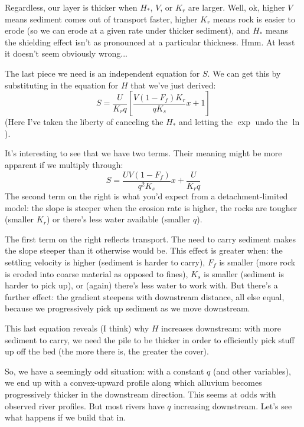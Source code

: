 \documentclass[12pt]{amsart}
\begin{document}
Regardless, our layer is thicker when $H_*$, $V$, or $K_r$ are larger. Well, ok, higher $V$ means sediment comes out of transport faster, higher $K_r$ means rock is easier to erode (so we can erode at a given rate under thicker sediment), and $H_*$ means the shielding effect isn't as pronounced at a particular thickness. Hmm. At least it doesn't seem obviously wrong...

The last piece we need is an independent equation for $S$. We can get this by substituting in the equation for $H$ that we've just derived:
\begin{equation}
S = \frac{U}{K_r q} \left[ \frac{V (1 - F_f) K_r}{q K_s} x + 1 \right]
\end{equation}
(Here I've taken the liberty of canceling the $H_*$ and letting the $\exp$ undo the $\ln$).

It's interesting to see that we have two terms. Their meaning might be more apparent if we multiply through:
\begin{equation}
S = \frac{UV (1 - F_f)}{q^2 K_s} x + \frac{U}{K_r q}
\end{equation}
The second term on the right is what you'd expect from a detachment-limited model: the slope is steeper when the erosion rate is higher, the rocks are tougher (smaller $K_r$) or there's less water available (smaller $q$). 

The first term on the right reflects transport. The need to carry sediment makes the slope steeper than it otherwise would be. This effect is greater when: the settling velocity is higher (sediment is harder to carry), $F_f$ is smaller (more rock is eroded into coarse material as opposed to fines), $K_s$ is smaller (sediment is harder to pick up), or (again) there's less water to work with. But there's a further effect: the gradient steepens with downstream distance, all else equal, because we progressively pick up sediment as we move downstream.

This last equation reveals (I think) why $H$ increases downstream: with more sediment to carry, we need the pile to be thicker in order to efficiently pick stuff up off the bed (the more there is, the greater the cover).

So, we have a seemingly odd situation: with a constant $q$ (and other variables), we end up with a convex-upward profile along which alluvium becomes progressively thicker in the downstream direction. This seems at odds with observed river profiles. But most rivers have $q$ increasing downstream. Let's see what happens if we build that in.
\end{document}
